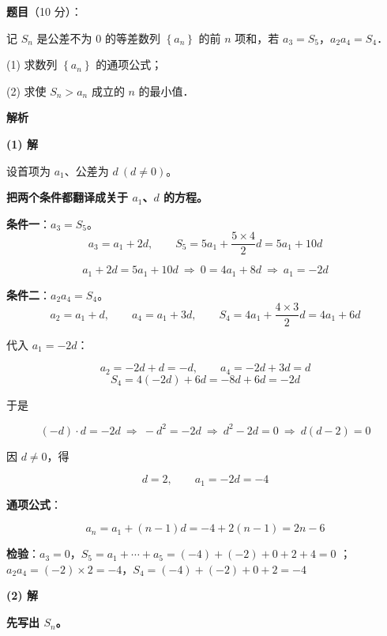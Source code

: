 \begin{answer}

\textbf{题目}（10 分）：

记 $S_n$ 是公差不为 $0$ 的等差数列 $\left\{a_n\right\}$ 的前 $n$ 项和，若 $a_3=S_5$，$a_2a_4=S_4$．

  (1) 求数列 $\left\{a_n\right\}$ 的通项公式；

  (2) 求使 $S_n>a_n$ 成立的 $n$ 的最小值．

\textbf{解析}

\par\medskip

\textbf{(1) 解}

设首项为 $a_1$、公差为 $d\ (d\ne0)$。

\textbf{把两个条件都翻译成关于 $a_1$、$d$ 的方程。}

\textbf{条件一}：$a_3=S_5$。
\nopagebreak[4]
\[a_3=a_1+2d,\qquad S_5=5a_1+\frac{5\times4}2d=5a_1+10d\]

\nopagebreak[4]
\[a_1+2d=5a_1+10d\ \Longrightarrow\ 0=4a_1+8d\ \Longrightarrow\ \boxed{a_1=-2d}\]

\textbf{条件二}：$a_2a_4=S_4$。
\nopagebreak[4]
\[a_2=a_1+d,\qquad a_4=a_1+3d,\qquad S_4=4a_1+\frac{4\times3}2d=4a_1+6d\]

代入 $a_1=-2d$：

\nopagebreak[4]
\[a_2=-2d+d=-d,\qquad a_4=-2d+3d=d\]
\nopagebreak[4]
\[S_4=4(-2d)+6d=-8d+6d=-2d\]

于是

\nopagebreak[4]
\[(-d)\cdot d=-2d\ \Longrightarrow\ -d^{2}=-2d\ \Longrightarrow\ d^{2}-2d=0\ \Longrightarrow\ d(d-2)=0\]

因 $d\ne0$，得

\nopagebreak[4]
\[d=2,\qquad a_1=-2d=-4\]

\textbf{通项公式}：

\nopagebreak[4]
\[a_n=a_1+(n-1)d=-4+2(n-1)=2n-6\]

\textbf{检验}：$a_3=0$，$S_5=a_1+\cdots+a_5=(-4)+(-2)+0+2+4=0$ ；$a_2a_4=(-2)\times2=-4$，$S_4=(-4)+(-2)+0+2=-4$ 

\par\medskip

\textbf{(2) 解}

\textbf{先写出 $S_n$。}


\end{answer}
